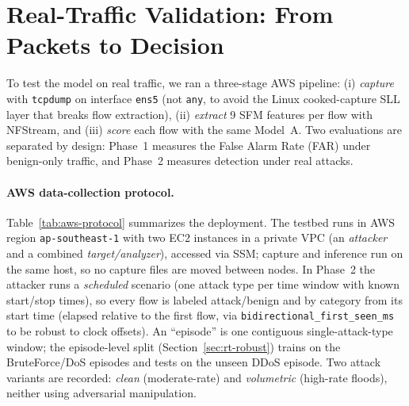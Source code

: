 \documentclass[preprint,12pt,authoryear]{elsarticle}
\begin{document}
\section{Real-Traffic Validation: From Packets to Decision}
\label{sec:realtraffic}

To test the model on real traffic, we ran a three-stage AWS pipeline:
(i) \emph{capture} with \texttt{tcpdump} on interface \texttt{ens5} (not
\texttt{any}, to avoid the Linux cooked-capture SLL layer that breaks flow
extraction), (ii) \emph{extract} 9 SFM features per flow with NFStream, and
(iii) \emph{score} each flow with the same Model~A. Two evaluations are separated
by design: Phase~1 measures the False Alarm Rate (FAR) under benign-only traffic,
and Phase~2 measures detection under real attacks.

\paragraph{AWS data-collection protocol.} Table~\ref{tab:aws-protocol} summarizes
the deployment. The testbed runs in AWS region \texttt{ap-southeast-1} with two EC2
instances in a private VPC (an \emph{attacker} and a combined
\emph{target/analyzer}), accessed via SSM; capture and inference run on the same
host, so no capture files are moved between nodes. In Phase~2 the attacker runs a
\emph{scheduled} scenario (one attack type per time window with known start/stop
times), so every flow is labeled attack/benign and by category from its start time
(elapsed relative to the first flow, via \texttt{bidirectional\_first\_seen\_ms} to
be robust to clock offsets). An ``episode'' is one contiguous single-attack-type
window; the episode-level split (Section~\ref{sec:rt-robust}) trains on the
BruteForce/DoS episodes and tests on the unseen DDoS episode. Two attack variants
are recorded: \emph{clean} (moderate-rate) and \emph{volumetric} (high-rate
floods), neither using adversarial manipulation.
\end{document}
